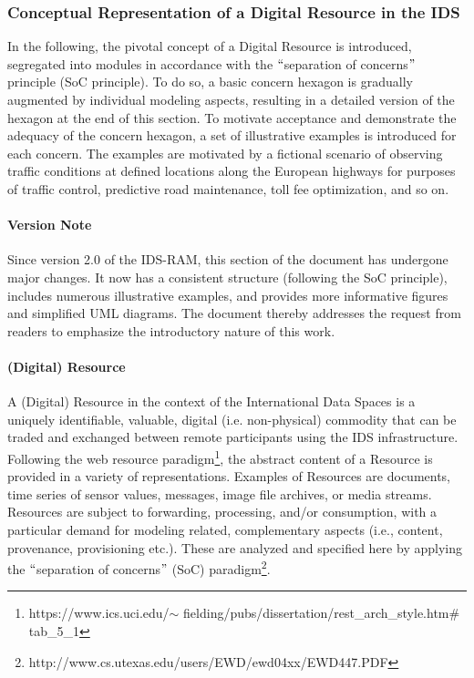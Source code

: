 \subsubsection{Conceptual Representation of a Digital Resource in the IDS}
In the following, the pivotal concept of a Digital Resource is introduced, segregated into modules in accordance with the $``$separation of concerns$"$  principle (SoC principle). To do so, a basic concern hexagon is gradually augmented by individual modeling aspects, resulting in a detailed version of the hexagon at the end of this section. To motivate acceptance and demonstrate the adequacy of the concern hexagon, a set of illustrative examples is introduced for each concern. The examples are motivated by a fictional scenario of observing traffic conditions at defined locations along the European highways for purposes of traffic control, predictive road maintenance, toll fee optimization, and so on.


\paragraph{Version Note\\}
Since version 2.0 of the IDS-RAM, this section of the document has undergone major changes. It now has a consistent structure (following the SoC principle), includes numerous illustrative examples, and provides more informative figures and simplified UML diagrams. The document thereby addresses the request from readers to emphasize the introductory nature of this work.


\paragraph{(Digital) Resource\\}
A (Digital) Resource in the context of the International Data Spaces is a uniquely identifiable, valuable, digital (i.e. non-physical) commodity that can be traded and exchanged between remote participants using the IDS infrastructure. Following the web resource paradigm\footnote{https://www.ics.uci.edu/$ \sim $ fielding/pubs/dissertation/rest\_arch\_style.htm$\#$ tab\_5\_1 }, the abstract content of a Resource is provided in a variety of representations. Examples of Resources are documents, time series of sensor values, messages, image file archives, or media streams. Resources are subject to forwarding, processing, and/or consumption, with a particular demand for modeling related, complementary aspects (i.e., content, provenance, provisioning etc.). These are analyzed and specified here by applying the $``$separation of concerns$"$  (SoC) paradigm\footnote{http://www.cs.utexas.edu/users/EWD/ewd04xx/EWD447.PDF }.


